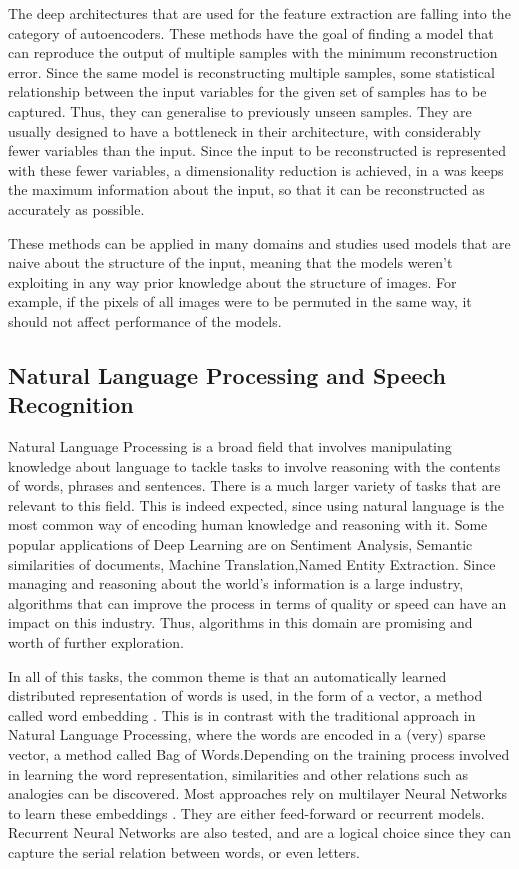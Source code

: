 \documentclass[a4paper]{article}
\begin{document}
			The deep architectures that are used for the feature extraction are falling into the category of autoencoders. These methods have the goal of finding a model that can reproduce the output of multiple samples with the minimum reconstruction error. Since the same model is reconstructing multiple samples, some statistical relationship between the input variables for the given set of samples has to be captured. Thus, they can generalise to previously unseen samples.
			They are usually designed to have a bottleneck in their architecture, with considerably fewer variables than the input. Since the input to be reconstructed is represented with these fewer variables, a dimensionality reduction is achieved, in a was keeps the maximum information about the input, so that it can be reconstructed as accurately as possible.
			
			These methods can be applied in many domains and studies used models that are naive about the structure of the input, meaning that the models weren't exploiting in any way prior knowledge about the structure of images. For example, if the pixels of all images were to be permuted in the same way, it should not affect performance of the models.
			
	\subsection{Natural Language Processing and Speech Recognition}
	\label{sec: NLP_Audio}
		Natural Language Processing is a broad field that involves manipulating knowledge about language to tackle tasks to involve reasoning with the contents of words, phrases and sentences. There is a much larger variety of tasks that are relevant to this field. This is indeed expected, since using natural language is the most common way of encoding human knowledge and reasoning with it. 
		Some popular applications of Deep Learning are on Sentiment Analysis, Semantic similarities of documents, Machine Translation,Named Entity Extraction. Since managing and reasoning about the world's information is a large industry, algorithms that can improve the process in terms of quality or speed can have an impact on this industry. Thus, algorithms in this domain are promising and worth of further exploration.
		
		In all of this tasks, the common theme is that an automatically learned distributed representation of words is used, in the form of a vector, a method called word embedding \cite{Collobert2008}. This is in contrast with the traditional approach in Natural Language Processing, where the words are encoded in a (very) sparse vector, a method called Bag of Words.Depending on the training process involved in learning the word representation, similarities and other relations such as analogies can be discovered. Most approaches rely on multilayer Neural Networks to learn these embeddings \cite{Collobert2008,Collobert 2011}. They are either feed-forward or recurrent models. Recurrent Neural Networks are  also tested, and are a logical choice since they can capture the serial relation between words, or even letters. 
		 
\end{document}

